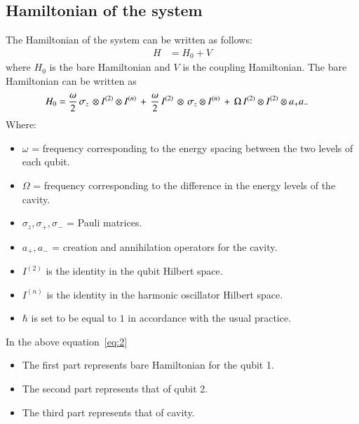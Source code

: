 \subsection{Hamiltonian of the system}
The Hamiltonian of the system can be written as follows:
\begin{align}\label{eq:1}
H &= H_{0} + V
\end{align}
where $H_{0}$ is the bare Hamiltonian and $V$ is the coupling Hamiltonian. 
The bare Hamiltonian can be written as
\begin{align}\label{eq:2}
{H}_{0}&=\frac{\omega}{2}\thinspace{\sigma}_{z}\thinspace\otimes I^{(2)}\otimes{I^{(n)}}\thinspace + \thinspace\frac{\omega}{2}\thinspace{I^{(2)}}\thinspace\otimes\thinspace{\sigma}_{z}\otimes{I^{(n)}}\thinspace+\thinspace\Omega\thinspace I^{(2)}\otimes I^{(2)}\otimes{a}_{+}{a}_{- }
\end{align}
Where: 
\begin{itemize}
\item $\omega$ = frequency corresponding to the energy spacing  between the two levels of each qubit.
\item $\Omega$ = frequency corresponding to the difference in the energy levels of the cavity.
\item ${\sigma}_{z}, {\sigma}_{+}, {\sigma}_{-}$ =  Pauli matrices.   
\item ${a}_{+}, {a}_{-}$ = creation and annihilation operators for the cavity.
\item $I^{(2)}$ is the identity in the qubit Hilbert space.
\item $I^{(n)}$ is the identity in the harmonic oscillator Hilbert space.
\item $\hbar$ is set to be equal to $1$ in accordance with the usual practice. 
\end{itemize}
In the above equation~\eqref{eq:2} %
\begin{itemize}
\item The first part represents bare Hamiltonian for the qubit 1.
\item The second part represents that of qubit 2.
\item The third  part represents that of  cavity. 
\end{itemize}

